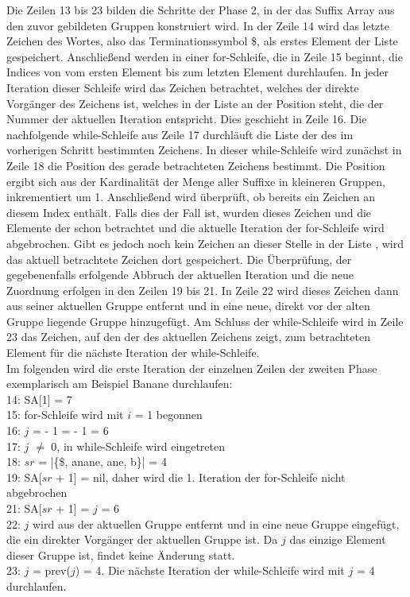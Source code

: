 Die Zeilen 13 bis 23 bilden die Schritte der Phase 2, in der das Suffix Array aus den zuvor gebildeten Gruppen konstruiert wird. 
In der Zeile 14 wird das letzte Zeichen des Wortes, also das Terminationssymbol \$, als erstes Element der Liste \sa gespeichert. 
Anschließend werden in einer for-Schleife, die in Zeile 15 beginnt, die Indices von \sa vom ersten Element bis zum letzten Element durchlaufen. 
In jeder Iteration dieser Schleife wird das Zeichen betrachtet, welches der direkte Vorgänger des Zeichens ist, welches in der Liste \sa an der Position steht, die der Nummer der aktuellen Iteration entspricht. 
Dies geschieht in Zeile 16. Die nachfolgende while-Schleife aus Zeile 17 durchläuft die Liste der \prevpointer des im vorherigen Schritt bestimmten Zeichens. 
In dieser while-Schleife wird zunächst in Zeile 18 die Position des gerade betrachteten Zeichens bestimmt. 
Die Position ergibt sich aus der Kardinalität der Menge aller Suffixe in kleineren Gruppen, inkrementiert um 1. 
Anschließend wird überprüft, ob \sa bereits ein Zeichen an diesem Index enthält. 
Falls dies der Fall ist, wurden dieses Zeichen und die Elemente der \prevpointer schon betrachtet und die aktuelle Iteration der for-Schleife wird abgebrochen. 
Gibt es jedoch noch kein Zeichen an dieser Stelle in der Liste \sa, wird das aktuell betrachtete Zeichen dort gespeichert. 
Die Überprüfung, der gegebenenfalls erfolgende Abbruch der aktuellen Iteration und die neue Zuordnung erfolgen in den Zeilen 19 bis 21. 
In Zeile 22 wird dieses Zeichen dann aus seiner aktuellen Gruppe entfernt und in eine neue, direkt vor der alten Gruppe liegende Gruppe hinzugefügt.
Am Schluss der while-Schleife wird in Zeile 23 das Zeichen, auf den der \prevpointer des aktuellen Zeichens zeigt, zum betrachteten Element für die nächste Iteration der while-Schleife.\\

Im folgenden wird die erste Iteration der einzelnen Zeilen der zweiten Phase exemplarisch am Beispiel Banane durchlaufen:\\
14: 	SA[1] = 7\\
15:	for-Schleife wird mit $i$ = 1 begonnen\\
16:	$j$ = \sa[$i$] - 1 = \sa[1] - 1 = 6\\
17:	$j$ $\neq$ 0, in while-Schleife wird eingetreten\\
18:	$sr$ = |\{\$, anane, ane, b\}| = 4\\
19:	SA[$sr$ + 1] = nil, daher wird die 1. Iteration der for-Schleife nicht abgebrochen\\
21:	SA[$sr$ + 1] = $j$ = 6\\
22: 	$j$ wird aus der aktuellen Gruppe entfernt und in eine neue Gruppe eingefügt, die ein direkter Vorgänger der aktuellen Gruppe ist. Da $j$ das einzige Element dieser Gruppe ist, findet keine Änderung statt.\\
23:	$j$ = prev($j$) = 4. Die nächste Iteration der while-Schleife wird mit $j$ = 4 durchlaufen.

%
\clearpage %
